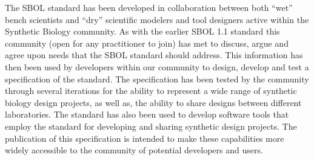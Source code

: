 The SBOL standard has been developed in collaboration between both ``wet'' bench scientists and ``dry'' scientific modelers and tool designers active within the Synthetic Biology community. 
As with the earlier SBOL 1.1 standard this community (open for any practitioner to join) has met to discuss, argue and agree upon needs that the SBOL standard should address. 
This information has then been used by developers within our community to design, develop and test a specification of the standard. The specification has been tested by the community through several iterations for the ability to represent a wide range of synthetic biology design projects, as well as, the ability to share designs between different laboratories. 
The standard has also been used to develop software tools that employ the standard for developing and sharing synthetic design projects. 
The publication of this specification is intended to make these capabilities more widely accessible to the community of potential developers and users.